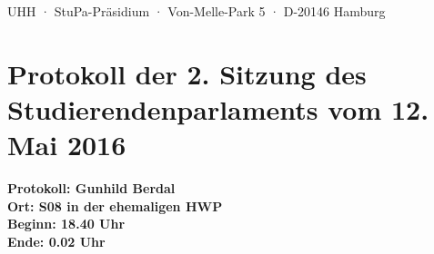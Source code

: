 \documentclass[ngerman,headheight=70pt]{scrartcl}
\begin{document}
    UHH · StuPa-Präsidium · Von-Melle-Park 5 · D-20146 Hamburg

    \section*{Protokoll der 2. Sitzung des Studierendenparlaments vom 12. Mai 2016}

    \textbf{Protokoll: Gunhild Berdal}\\
    \textbf{Ort: S08 in der ehemaligen HWP}\\
    \textbf{Beginn: 18.40 Uhr}\\
    \textbf{Ende: 0.02 Uhr}

    \vspace{0.5cm}
\end{document}
